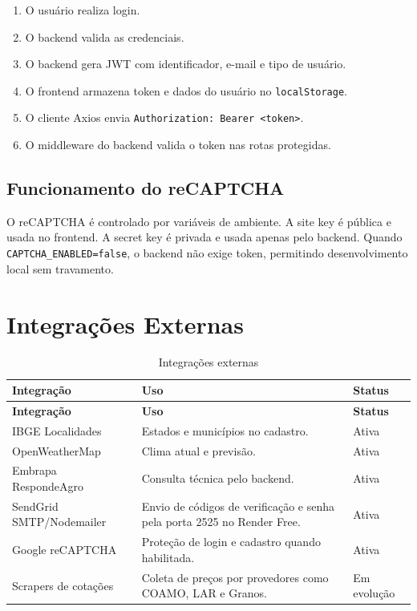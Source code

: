 \documentclass[
  12pt,
  oneside,
  a4paper,
  brazil
]{abntex2}
\begin{document}
\begin{enumerate}
  \item O usuário realiza login.
  \item O backend valida as credenciais.
  \item O backend gera JWT com identificador, e-mail e tipo de usuário.
  \item O frontend armazena token e dados do usuário no \texttt{localStorage}.
  \item O cliente Axios envia \texttt{Authorization: Bearer <token>}.
  \item O middleware do backend valida o token nas rotas protegidas.
\end{enumerate}

\section{Funcionamento do reCAPTCHA}

O reCAPTCHA é controlado por variáveis de ambiente. A site key é pública e usada no frontend. A secret key é privada e usada apenas pelo backend. Quando \texttt{CAPTCHA\_ENABLED=false}, o backend não exige token, permitindo desenvolvimento local sem travamento.

\chapter{Integrações Externas}

\begin{longtable}{@{}p{}p{}p{}@{}}
\caption{Integrações externas}\\
\toprule
\textbf{Integração} & \textbf{Uso} & \textbf{Status} \\
\midrule
\endfirsthead
\toprule
\textbf{Integração} & \textbf{Uso} & \textbf{Status} \\
\midrule
\endhead
IBGE Localidades & Estados e municípios no cadastro. & Ativa \\
OpenWeatherMap & Clima atual e previsão. & Ativa \\
Embrapa RespondeAgro & Consulta técnica pelo backend. & Ativa \\
SendGrid SMTP/Nodemailer & Envio de códigos de verificação e senha pela porta 2525 no Render Free. & Ativa \\
Google reCAPTCHA & Proteção de login e cadastro quando habilitada. & Ativa \\
Scrapers de cotações & Coleta de preços por provedores como COAMO, LAR e Granos. & Em evolução \\
\bottomrule
\end{longtable}
\end{document}
